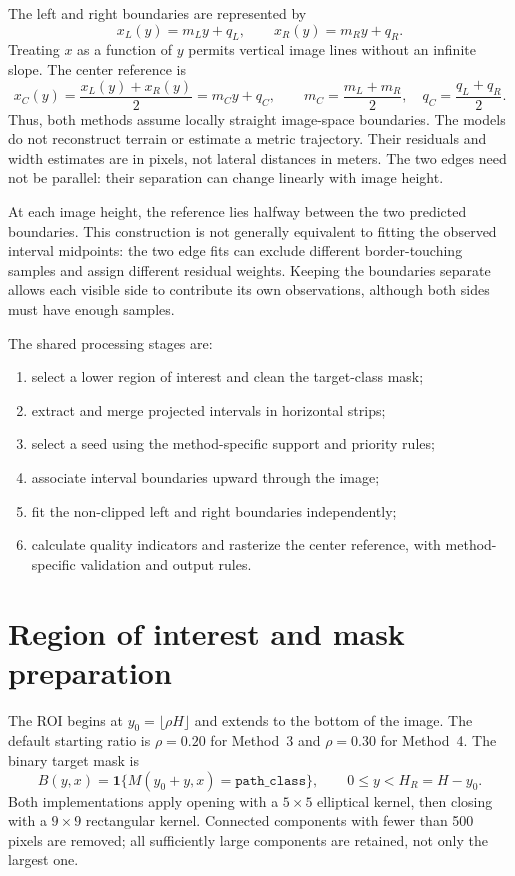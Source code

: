The left and right boundaries are represented by
\begin{equation}
    x_L(y)=m_Ly+q_L, \qquad x_R(y)=m_Ry+q_R.
    \label{eq:c4_edges}
\end{equation}
Treating $x$ as a function of $y$ permits vertical image lines without an
infinite slope. The center reference is
\begin{equation}
    x_C(y)=\frac{x_L(y)+x_R(y)}{2}=m_Cy+q_C,
    \qquad m_C=\frac{m_L+m_R}{2},\quad q_C=\frac{q_L+q_R}{2}.
    \label{eq:c4_line}
\end{equation}
Thus, both methods assume locally straight image-space boundaries.
The models do not reconstruct terrain or estimate a metric trajectory.
Their residuals and width estimates are in pixels, not lateral distances
in meters. The two edges need not be parallel: their separation can
change linearly with image height.

At each image height, the reference lies halfway between the two
predicted boundaries. This construction is not generally equivalent to
fitting the observed interval midpoints: the two edge fits can exclude
different border-touching samples and assign different residual weights.
Keeping the boundaries separate allows each visible side to contribute
its own observations, although both sides must have enough samples.

The shared processing stages are:
\begin{enumerate}
    \item select a lower region of interest and clean the target-class mask;
    \item extract and merge projected intervals in horizontal strips;
    \item select a seed using the method-specific support and priority rules;
    \item associate interval boundaries upward through the image;
    \item fit the non-clipped left and right boundaries independently;
    \item calculate quality indicators and rasterize the center reference,
    with method-specific validation and output rules.
\end{enumerate}

\section{Region of interest and mask preparation}
\label{sec:c4_roi}

The ROI begins at $y_0=\lfloor\rho H\rfloor$ and extends to the bottom
of the image. The default starting ratio is $\rho=0.20$ for Method~3
and $\rho=0.30$ for Method~4. The binary target mask is
\begin{equation}
    B(y,x)=\mathbf{1}\{M(y_0+y,x)=\texttt{path\_class}\},
    \qquad 0\leq y<H_R=H-y_0.
\end{equation}
Both implementations apply opening with a $5\times5$ elliptical kernel,
then closing with a $9\times9$ rectangular kernel. Connected components
with fewer than 500 pixels are removed; all sufficiently large components
are retained, not only the largest one.

